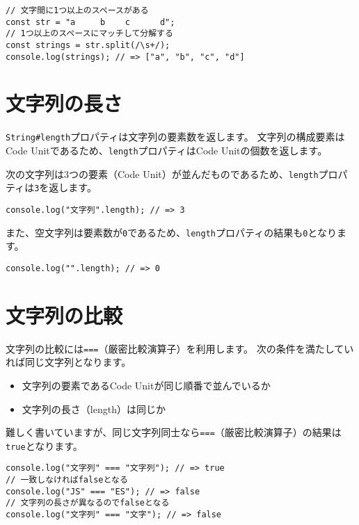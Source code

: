 \begin{lstlisting}
// 文字間に1つ以上のスペースがある
const str = "a     b    c      d";
// 1つ以上のスペースにマッチして分解する
const strings = str.split(/\s+/);
console.log(strings); // => ["a", "b", "c", "d"] 
\end{lstlisting}

\hypertarget{length}{%
\section{文字列の長さ}\label{length}}

\texttt{String\#length}プロパティは文字列の要素数を返します。
文字列の構成要素はCode
Unitであるため、\texttt{length}プロパティはCode
Unitの個数を返します。

次の文字列は3つの要素（Code
Unit）が並んだものであるため、\texttt{length}プロパティは\texttt{3}を返します。

\begin{lstlisting}
console.log("文字列".length); // => 3
\end{lstlisting}

また、空文字列は要素数が\texttt{0}であるため、\texttt{length}プロパティの結果も\texttt{0}となります。

\begin{lstlisting}
console.log("".length); // => 0
\end{lstlisting}

\hypertarget{compare}{%
\section{文字列の比較}\label{compare}}

文字列の比較には\texttt{===}（厳密比較演算子）を利用します。
次の条件を満たしていれば同じ文字列となります。

\begin{itemize}
\item
  文字列の要素であるCode Unitが同じ順番で並んでいるか
\item
  文字列の長さ（length）は同じか
\end{itemize}

難しく書いていますが、同じ文字列同士なら\texttt{===}（厳密比較演算子）の結果は\texttt{true}となります。

\begin{lstlisting}
console.log("文字列" === "文字列"); // => true
// 一致しなければfalseとなる
console.log("JS" === "ES"); // => false
// 文字列の長さが異なるのでfalseとなる
console.log("文字列" === "文字"); // => false
\end{lstlisting}

